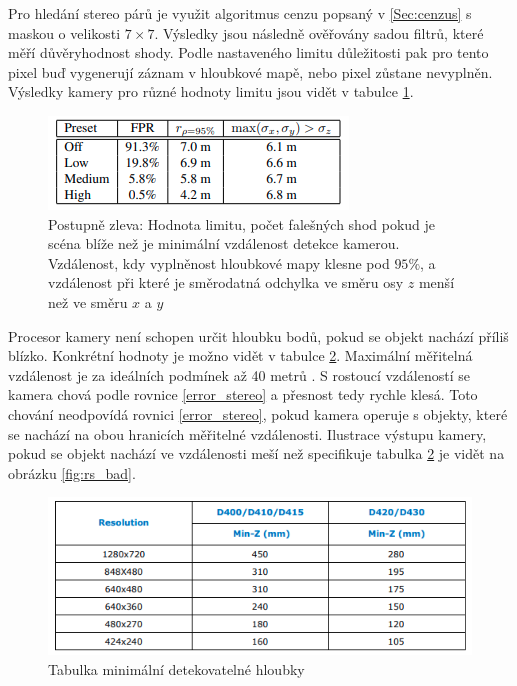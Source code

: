 \documentclass[twoside]{ctuthesis}
\begin{document}
    Pro hledání stereo párů je využit algoritmus cenzu popsaný v \ref{Sec:cenzus} s maskou o velikosti $7 \times 7 $. Výsledky jsou následně ověřovány sadou filtrů, které měří důvěryhodnost shody. Podle nastaveného limitu důležitosti pak pro tento pixel buď vygenerují záznam v hloubkové mapě, nebo pixel zůstane nevyplněn. Výsledky kamery pro různé hodnoty limitu jsou vidět v tabulce \ref{fig:tablka_limity}. 
\begin{figure}
    \centering
    \includegraphics[width = 0.8\linewidth]{pictures/realsense_threshold.png}
    \caption{Postupně zleva: Hodnota limitu, počet falešných shod pokud je scéna blíže než je minimální vzdálenost detekce kamerou. Vzdálenost, kdy vyplněnost hloubkové mapy klesne pod $95\%$, a vzdálenost při které je směrodatná odchylka ve směru osy $z$ menší než ve směru $x$ a $y$ \cite{keselman2017intel}}
    \label{fig:tablka_limity}
\end{figure}

Procesor kamery není schopen určit hloubku bodů, pokud se objekt nachází příliš blízko. Konkrétní hodnoty je možno vidět v tabulce \ref{fig:minimalni_hloubka}. Maximální měřitelná vzdálenost je za ideálních podmínek až 40 metrů \cite{keselman2017intel}. S rostoucí vzdáleností se kamera chová podle rovnice \ref{error_stereo} a přesnost tedy rychle klesá. Toto chování neodpovídá rovnici \ref{error_stereo}, pokud kamera operuje s objekty, které se nachází na obou hranicích měřitelné vzdálenosti. Ilustrace výstupu kamery, pokud se objekt nachází ve vzdálenosti meší než specifikuje tabulka \ref{fig:minimalni_hloubka} je vidět na obrázku \ref{fig:rs_bad}.

\begin{figure}
    \centering
    \includegraphics[width = 0.8\linewidth]{pictures/minimalni_vzdalenost.png}
    \caption{Tabulka minimální detekovatelné hloubky \cite{RealSense_datasheet}}
    \label{fig:minimalni_hloubka}
\end{figure}
\end{document}
